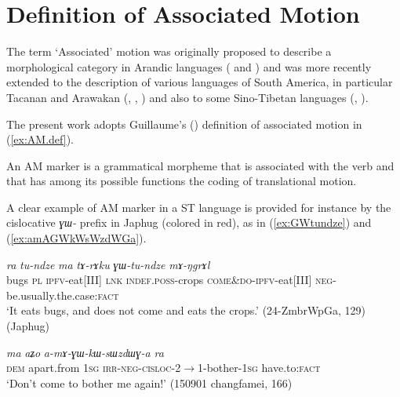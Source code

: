 \documentclass[oneside,a4paper,11pt]{article}
\newcommand{\ipa}[1]{{\phon\textit{#1}}}
\newcommand{\rouge}[1]{{\color{red}#1}}
\begin{document}
\section{Definition of Associated Motion}

The term `Associated' motion was originally proposed to describe a morphological category in Arandic languages (\citealt{koch84associated.motion} and \citealt{wilkins91associated.motion}) and was more recently extended to the description of various languages of South America, in particular Tacanan and Arawakan (\citealt{guillaume09mouv.assoc}, \citealt{rose15am}, \citealt{guillaume16am}) and also to some Sino-Tibetan languages (\citealt{jacques13harmonization}, \citealt{konnerth15cisloc}).

The present work adopts Guillaume's (\citeyear[13]{guillaume16am}) definition of associated motion in (\ref{ex:AM.def}).


\begin{exe}
\ex \label{ex:AM.def}
 \glt An AM marker is a grammatical morpheme that is associated with the verb and that has among its possible functions the coding of translational motion.
\end{exe}

A clear example of AM marker in a ST language is provided for instance by the cislocative \ipa{ɣɯ-} prefix in Japhug (colored in red), as in (\ref{ex:GWtundze}) and (\ref{ex:amAGWkWsWzdWGa}). 
 
\begin{exe}
\ex \label{ex:GWtundze}
 \gll  \ipa{qajɯ}   \ipa{ra}  \ipa{tu-ndze} \ipa{ma} \ipa{tɤ-rɤku}  \ipa{\rouge{ɣɯ}-tu-ndze} \ipa{mɤ-ŋgrɤl} \\
bugs \textsc{pl} \textsc{ipfv}-eat[III] \textsc{lnk} \textsc{indef}.\textsc{poss}-crops   \textsc{\rouge{come\&do}}-\textsc{ipfv}-eat[III] \textsc{neg}-be.usually.the.case:\textsc{fact} \\
\glt `It eats bugs, and does not \rouge{come and} eats the crops.' (24-ZmbrWpGa, 129) (Japhug)
\end{exe}

\begin{exe}
\ex \label{ex:amAGWkWsWzdWGa}
 \gll     \ipa{nɯ}   \ipa{ma}   \ipa{aʑo}   \ipa{a-mɤ-\rouge{ɣɯ}-kɯ-sɯzdɯɣ-a}   \ipa{ra} \\
 \textsc{dem} apart.from \textsc{1sg} \textsc{irr}-\textsc{neg}-\textsc{\rouge{cisloc}}-2$\rightarrow$1-bother-\textsc{1sg} have.to:\textsc{fact} \\
 \glt `Don't \rouge{come to} bother me again!' (150901 changfamei, 166)
\end{exe}
\end{document}
